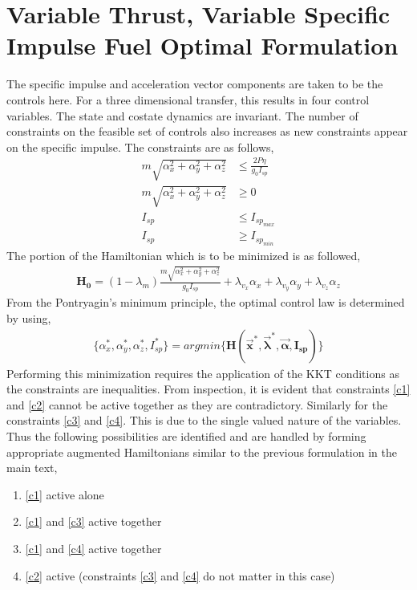
\chapter{Variable Thrust, Variable Specific Impulse Fuel Optimal Formulation}
\label{app3}
\ifpdf
\graphicspath{{Appendix2/}{Appendix3/}{Appendix3/}}
\else
\graphicspath{{Appendix3/}{Appendix3/}}
\fi

The specific impulse and acceleration vector components are taken to be the controls here. For a three dimensional transfer, this results in four control variables. The state and costate dynamics are invariant. The number of constraints on the feasible set of controls also increases as new constraints appear on the specific impulse. The constraints are as follows,
\begin{align}
	m\sqrt{\alpha_x^2+\alpha_y^2+\alpha_z^2}&\leq \frac{2P\eta}{g_0 I_{sp}}\label{c1}\\
	m\sqrt{\alpha_x^2+\alpha_y^2+\alpha_z^2}&\geq 0\label{c2}\\
	I_{sp}&\leq I_{sp_{max}}\label{c3}\\
	I_{sp}&\geq I_{sp_{min}}\label{c4}
\end{align}
The portion of the Hamiltonian which is to be minimized is as followed,
\begin{align}
	\boldsymbol{H_0}=(1-\lambda_m)\frac{m\sqrt{\alpha_x^2+\alpha_y^2+\alpha_z^2}}{g_0 I_{sp}}+\lambda_{v_x}\alpha_x+\lambda_{v_y}\alpha_y+\lambda_{v_z}\alpha_z
\end{align}
From the Pontryagin's minimum principle, the optimal control law is determined by using,
\begin{align}
	\{\alpha_x^*,\alpha_y^*,\alpha_z^*,I_{sp}^*\}=argmin\{\boldsymbol{H(\vec{x}^*,\vec{\lambda}^*,\vec{\alpha},I_{sp})}\}
\end{align}
Performing this minimization requires the application of the KKT conditions as the constraints are inequalities. From inspection, it is evident  that constraints \ref{c1} and \ref{c2} cannot be active together as they are contradictory. Similarly for the constraints \ref{c3} and \ref{c4}. This is due to the single valued nature of the variables. Thus the following possibilities are identified and are handled by forming appropriate augmented Hamiltonians similar to the previous formulation in the main text,
\begin{enumerate}[label=(\alph*)]
	\item \ref{c1} active alone
	\item \ref{c1} and \ref{c3} active together
	\item \ref{c1} and \ref{c4} active together
	\item \ref{c2} active (constraints \ref{c3} and \ref{c4} do not matter in this case)
\end{enumerate}
